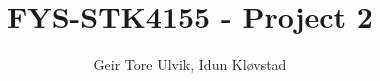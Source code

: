 \documentclass[12pt, notitlepage]{article}
\begin{document}
\title{FYS-STK4155 - Project 2}
\author{Geir Tore Ulvik, Idun Kløvstad}
\begin{titlingpage}
    \maketitle
    \begin{abstract}
    \end{abstract}
\end{titlingpage}






\appendix


\end{document}
